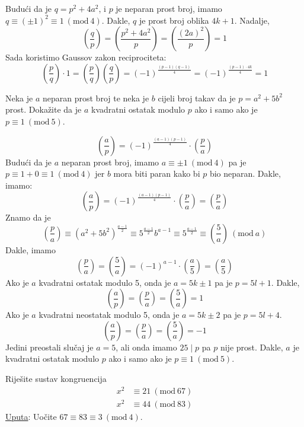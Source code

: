 \documentclass{exam}
\newcommand{\Mod}[1]{\ (\mathrm{mod}\ #1)}
\begin{document}
\begin{questions}
\begin{solution}
  Budući da je $q = p^2 + 4a^2$, i $p$ je neparan prost broj, imamo $q \equiv (\pm 1)^2 \equiv 1 \Mod{4}$. Dakle, $q$ je prost broj oblika $4k + 1$. Nadalje,
  \[
    \left( \frac{q}{p} \right) = \left( \frac{p^2 + 4a^2}{p} \right) = \left( \frac{(2a)^2}{p} \right) = 1
  \]
  Sada koristimo Gaussov zakon reciprociteta:
  \[
    \left( \frac{p}{q} \right) \cdot 1 = \left( \frac{p}{q} \right) \left( \frac{q}{p} \right) = (-1)^{\frac{(p-1)(q-1)}{4}} = (-1)^{\frac{(p-1) \cdot 4k}{4}} = 1
  \]
\end{solution}

\pagebreak

\question Neka je $a$ neparan prost broj te neka je $b$ cijeli broj takav da je $p = a^2 + 5b^2$ prost. Dokažite da je $a$ kvadratni ostatak modulo $p$ ako i samo ako je $p \equiv 1 \Mod{5}$.

\begin{solution}
  \[
    \left( \frac{a}{p} \right) = (-1)^{\frac{(a-1)(p-1)}{4}} \cdot \left( \frac{p}{a} \right)
  \]
  Budući da je $a$ neparan prost broj, imamo $a \equiv \pm 1 \Mod{4}$ pa je $p \equiv 1 + 0 \equiv 1 \Mod{4}$ jer $b$ mora biti paran kako bi $p$ bio neparan. Dakle, imamo:
  \[
    \left( \frac{a}{p} \right) = (-1)^{\frac{(a-1)(p-1)}{4}} \cdot \left( \frac{p}{a} \right) = \left( \frac{p}{a} \right)
  \]
  Znamo da je
  \[
    \left( \frac{p}{a} \right) \equiv (a^2 + 5b^2)^{\frac{a-1}{2}} \equiv 5^{\frac{a-1}{2}} b^{a-1} \equiv 5^{\frac{a-1}{2}} \equiv \left( \frac{5}{a} \right) \Mod{a}
  \]
  Dakle, imamo
  \[
    \left( \frac{p}{a} \right) = \left( \frac{5}{a} \right) = (-1)^{a-1} \cdot \left( \frac{a}{5} \right) = \left( \frac{a}{5} \right)
  \]
  Ako je $a$ kvadratni ostatak modulo 5, onda je $a = 5k \pm 1$ pa je $p = 5l + 1$. Dakle,
  \[
    \left( \frac{a}{p} \right) = \left( \frac{p}{a} \right) = \left( \frac{5}{a} \right) = 1
  \]
  Ako je $a$ kvadratni neostatak modulo 5, onda je $a = 5k \pm 2$ pa je $p = 5l + 4$.
  \[
    \left( \frac{a}{p} \right) = \left( \frac{p}{a} \right) = \left( \frac{5}{a} \right) = -1
  \]
  Jedini preostali slučaj je $a = 5$, ali onda imamo $25 \mid p$ pa $p$ nije prost. Dakle, $a$ je kvadratni ostatak modulo $p$ ako i samo ako je $p \equiv 1 \Mod{5}$.
\end{solution}

\pagebreak

\question Riješite sustav kongruencija
\begin{align*}
  x^2 &\equiv 21 \Mod{67} \\
  x^2 &\equiv 44 \Mod{83}
\end{align*}
\underline{Uputa}: Uočite $67 \equiv 83 \equiv 3 \Mod{4}$.


\end{questions}
\end{document}
